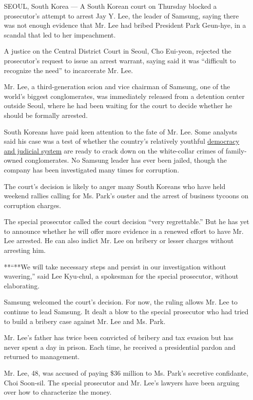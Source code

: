 SEOUL, South Korea --- A South Korean court on Thursday blocked a
prosecutor's attempt to arrest Jay Y. Lee, the leader of Samsung, saying
there was not enough evidence that Mr. Lee had bribed President Park
Geun-hye, in a scandal that led to her impeachment.

A justice on the Central District Court in Seoul, Cho Eui-yeon, rejected
the prosecutor's request to issue an arrest warrant, saying said it was
``difficult to recognize the need'' to incarcerate Mr. Lee.

Mr. Lee, a third-generation scion and vice chairman of Samsung, one of
the world's biggest conglomerates, was immediately released from a
detention center outside Seoul, where he had been waiting for the court
to decide whether he should be formally arrested.

South Koreans have paid keen attention to the fate of Mr. Lee. Some
analysts said his case was a test of whether the country's relatively
youthful
\href{https://www.nytimes.com/2017/01/02/world/asia/south-korea-park-geun-hye-samsung.html}{democracy
and judicial system} are ready to crack down on the white-collar crimes
of family-owned conglomerates. No Samsung leader has ever been jailed,
though the company has been investigated many times for corruption.

The court's decision is likely to anger many South Koreans who have held
weekend rallies calling for Ms. Park's ouster and the arrest of business
tycoons on corruption charges.

The special prosecutor called the court decision ``very regrettable.''
But he has yet to announce whether he will offer more evidence in a
renewed effort to have Mr. Lee arrested. He can also indict Mr. Lee on
bribery or lesser charges without arresting him.

**``**We will take necessary steps and persist in our investigation
without wavering,'' said Lee Kyu-chul, a spokesman for the special
prosecutor, without elaborating.

Samsung welcomed the court's decision. For now, the ruling allows Mr.
Lee to continue to lead Samsung. It dealt a blow to the special
prosecutor who had tried to build a bribery case against Mr. Lee and Ms.
Park.

Mr. Lee's father has twice been convicted of bribery and tax evasion but
has never spent a day in prison. Each time, he received a presidential
pardon and returned to management.

Mr. Lee, 48, was accused of paying \$36 million to Ms. Park's secretive
confidante, Choi Soon-sil. The special prosecutor and Mr. Lee's lawyers
have been arguing over how to characterize the money.

